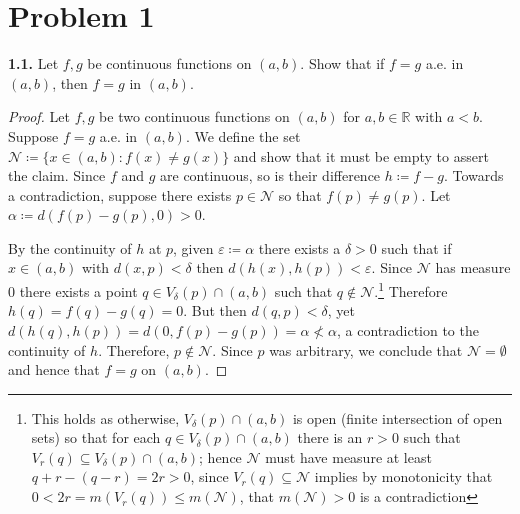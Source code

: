 \section*{Problem 1}
\noindent \textbf{1.1.} Let \( f, g \) be continuous functions on \( (a,b) \). Show that if \( f = g \) a.e. in \( (a,b) \), then \( f = g \) in \( (a,b). \)
\begin{proof}
Let \( f, g \) be two continuous functions on \( (a,b) \) for \( a,b \in \mathbb{R}  \) with \( a < b \). Suppose \( f = g \) a.e. in \( (a,b) \). We define the set \( \mathcal{N} \coloneqq \{ x \in (a,b) : f(x) \neq g(x) \}  \) and show that it must be empty to assert the claim. Since \( f \) and \( g \) are continuous, so is their difference \( h \coloneqq f - g \). Towards a contradiction, suppose there exists \( p \in \mathcal{N}  \) so that \( f(p) \neq g(p) \). Let \( \alpha \coloneqq d(f(p) - g(p), 0) >0\). 

By the continuity of \( h \) at \( p \), given \( \varepsilon \coloneqq \alpha \) there exists a \( \delta > 0 \) such that if \( x \in (a,b) \) with \( d(x, p) < \delta  \) then \( d(h(x), h(p)) < \varepsilon . \) Since \( \mathcal{N}  \) has measure 0 there exists a point \( q \in V_\delta (p) \cap (a,b) \) such that \( q \notin \mathcal{N}  \).\footnote{This holds as otherwise, \( V_\delta (p) \cap (a,b) \) is open (finite intersection of open sets) so that for each \( q \in V_\delta (p) \cap (a,b) \) there is an \(r > 0 \) such that \(V_r(q) \subseteq V_\delta (p) \cap (a,b) \); hence \( \mathcal{N}  \) must have measure at least \( q + r - (q - r ) = 2r   > 0\), since \( V_r(q) \subseteq \mathcal{N}  \) implies by monotonicity that \(0 < 2r = m(V_r(q)) \leq m(\mathcal{N} )\), that \( m(\mathcal{N} ) > 0 \) is a contradiction} Therefore \( h(q) = f(q) - g(q) = 0. \) But then \( d(q, p) < \delta  \), yet \(d(h(q), h(p)) = d(0, f(p)-g(p)) = \alpha \not < \alpha\), a contradiction to the continuity of \( h \). Therefore, \( p \notin \mathcal{N}  \). Since \( p \) was arbitrary, we conclude that \( \mathcal{N} = \emptyset  \) and hence that \( f = g \) on \( (a,b) \).
\end{proof}

